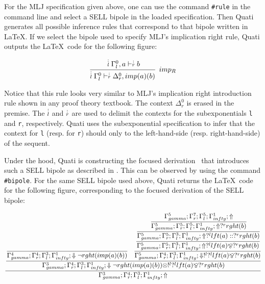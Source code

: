 \documentclass{llncs}
\newcommand{\ndots}[1]{\stackrel{\vcenter{\hbox{$\scriptstyle :$}\vskip-.35ex}}
   {\hbox {$ \scriptstyle {#1}$}}}
\begin{document}
For the MLJ specification given above, one can use the command \texttt{\#rule} in the command 
line and select a SELL bipole in the loaded specification. Then Quati generates all possible 
inference rules that correspond to that bipole written in \LaTeX. If we select the bipole used to specify 
MLJ's implication right rule, Quati outputs the \LaTeX\ code for the following figure:
\vspace{-3mm}

{\small
\[
\cfrac{ \ndots{l} \Gamma_{l}^{0}, a \vdash  \ndots{r} b}
{ \ndots{l} \Gamma_{l}^{0} \vdash  \ndots{r} \Delta_{r}^{0}, imp (a) (b) } \;\; imp_{R}
\]
}

Notice that this rule looks very similar to MLJ's implication right introduction rule shown in any proof theory 
textbook. The context $\Delta_{r}^{0}$ is erased in the premise. The $\ndots{l}$ and $\ndots{r}$ are used to 
delimit the contexts for the subexponentials \texttt{l} and \texttt{r}, respectively. Quati uses the subexponential 
specification to infer that the context for \texttt{l} (resp. for \texttt{r}) should only to the left-hand-side (resp. 
right-hand-side) of the sequent.

Under the hood, Quati is constructing the focused derivation~\cite{andreoli92jlc} that introduces such 
a SELL bipole as described in \cite{nigam.jlc}. This can be observed by using the command 
\texttt{\#bipole}. For the same SELL bipole used above, Quati returns
the \LaTeX\ code for the following figure, corresponding to the focused derivation of the SELL bipole:
\vspace{-4mm}


{\scriptsize\[\cfrac{\cfrac{\cfrac{}
{\Gamma_{ gamma}^{4} ; \Gamma_{r}^{4} ; \Gamma_{l}^{3} ; \Gamma_{ infty}^{1} ;  \Downarrow \neg rght (imp (a) (b) )  } \quad \cfrac{\cfrac{\cfrac{\cfrac{\Gamma_{ gamma}^{5} ; \Gamma_{r}^{7} ; \Gamma_{l}^{5} ; \Gamma_{ infty}^{1} ;  \Uparrow }
{\Gamma_{ gamma}^{5} ; \Gamma_{r}^{5} ; \Gamma_{l}^{5} ; \Gamma_{ infty}^{1} ;  \Uparrow  ?^{r} rght (b)  }}
{\Gamma_{ gamma}^{5} ; \Gamma_{r}^{5} ; \Gamma_{l}^{3} ; \Gamma_{ infty}^{1} ;  \Uparrow  ?^{l} lft (a)  ::  ?^{r} rght (b) }}
{\Gamma_{ gamma}^{5} ; \Gamma_{r}^{5} ; \Gamma_{l}^{3} ; \Gamma_{ infty}^{1} ;  \Uparrow  ?^{l} lft (a)  \bindnasrepma  ?^{r} rght (b)  }}
{\Gamma_{ gamma}^{5} ; \Gamma_{r}^{4} ; \Gamma_{l}^{3} ; \Gamma_{ infty}^{1} ;  \Downarrow  !^{l}  ?^{l} lft (a)  \bindnasrepma  ?^{r} rght (b)  }}
{\Gamma_{ gamma}^{3} ; \Gamma_{r}^{4} ; \Gamma_{l}^{3} ; \Gamma_{ infty}^{1} ;  \Downarrow \neg rght (imp (a) (b) )  \otimes  !^{l}  ?^{l} lft (a)  \bindnasrepma  ?^{r} rght (b) }}
{\Gamma_{ gamma}^{3} ; \Gamma_{r}^{4} ; \Gamma_{l}^{3} ; \Gamma_{ infty}^{1} ; \Uparrow }\]}
\end{document}
